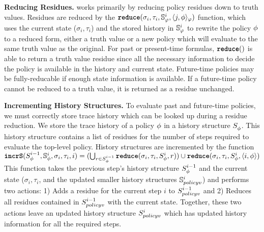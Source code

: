 \textbf{Reducing Residues.}
\monitor works primarily by reducing policy residues down to truth values. Residues are reduced by the $\reduce(\sigma_i, \tau_i, \histSt{i}, \rpt{j}{\policyv}{\policy})$ function, which uses the current state ($\sigma_i,\tau_i$) and the stored history in $\histSt{i}$ to rewrite the policy $\policyv$ to a reduced form, either a truth value or a new policy which will evaluate to the same truth value as the original. For past or present-time formulas, $\reduce()$ is able to return a truth value residue since all the necessary information to decide the policy is available in the history and current state. Future-time policies may be fully-reducable if enough state information is available. If a future-time policy cannot be reduced to a truth value, it is returned as a residue unchanged.

\textbf{Incrementing History Structures.}
To evaluate past and future-time policies, we must correctly store trace history which can be looked up during a residue reduction. 
We store the trace history of a policy $\policyv$ in a history structure $\histst[\policyv]{}$. 
This history structure contains a list of residues for the number of steps required to evaluate the top-level policy. History structures are incremented by the function 
$\incrS(\histst[\policyv]{i-1}, \histSt[\policyv]{i}, \sigma_i, \tau_i, i) = (\bigcup_{r \in \histst[\policyv]{i-1}} \reduce(\sigma_i, \tau_i, \histst[\policyv]{i}, r)) \cup \reduce(\sigma_i, \tau_i, \histst[\policyv]{i}, \rp{i}{\policyv})$
%
This function takes the previous step's history structure $\histst[\policyv]{i-1}$ and the current state ($\sigma_i,\tau_i$, and the updated smaller history structures $\histSt[policyv]{i}$) and performs two actions:
	1) Adds a residue for the current step $i$ to $\histst[policyv]{i-1}$ and
	2) Reduces all residues contained in $\histst[policyv]{i-1}$ with the current state.
Together, these two actions leave an updated history structure $\histst[policyv]{i}$ which has updated history information for all the required steps.

